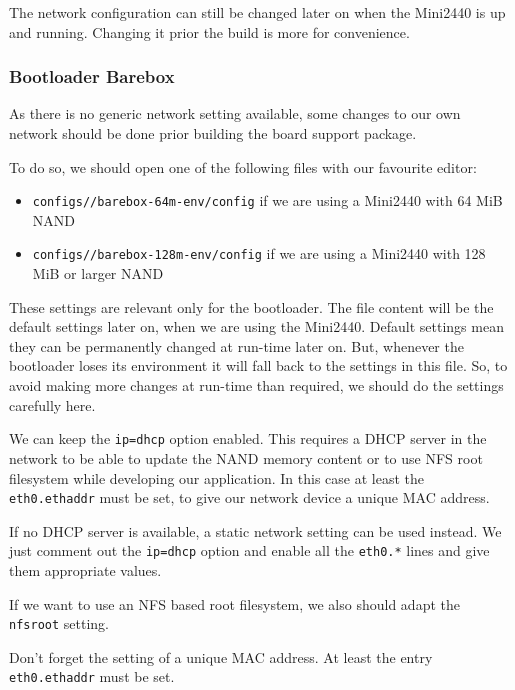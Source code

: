 \begin{important}
The network configuration can still be changed later on when the Mini2440 is
up and running. Changing it prior the build is more for convenience.
\end{important}

\subsubsection{Bootloader Barebox}		\label{sec:bootloadernetwork}

As there is no generic network setting available, some changes to our own
network should be done prior building the board support package.

To do so, we should open one of the following files with our favourite editor:

\begin{itemize}
 \item \texttt{configs/\ptxdistPlatformName /barebox-64m-env/config} if we are using
 a Mini2440 with 64 MiB NAND
 \item \texttt{configs/\ptxdistPlatformName /barebox-128m-env/config} if we are using
 a Mini2440 with 128 MiB or larger NAND
\end{itemize}

These settings are relevant only for the bootloader. The file content will be
the default settings later on, when we are using the Mini2440. Default
settings mean they can be permanently changed at run-time later on. But, whenever
the bootloader loses its environment it will fall back to the settings in this
file. So, to avoid making more changes at run-time than required, we should do the
settings carefully here.

We can keep the \texttt{ip=dhcp} option enabled. This requires a DHCP server in
the network to be able to update the NAND memory content or to use NFS root
filesystem while developing our application. In this case at least the
\texttt{eth0.ethaddr} must be set, to give our network device a unique MAC
address.

If no DHCP server is available, a static network setting can be used instead.
We just comment out the \texttt{ip=dhcp} option and enable all the
\texttt{eth0.*} lines and give them appropriate values.

If we want to use an NFS based root filesystem, we also should adapt the
\texttt{nfsroot} setting.

\begin{important}
Don't forget the setting of a unique MAC address. At least the entry
\texttt{eth0.ethaddr} must be set.
\end{important}

